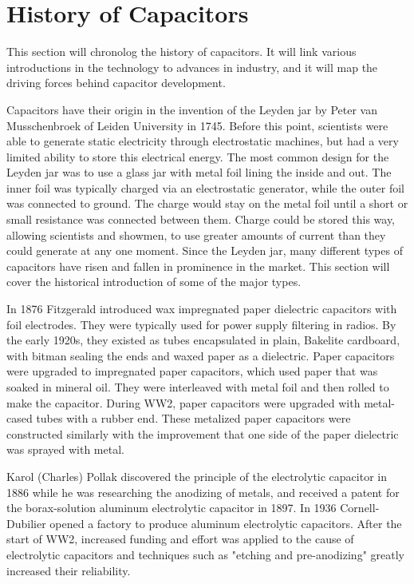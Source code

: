 \section {History of Capacitors}

This section will chronolog the history of capacitors. It will link various introductions in the technology to advances in industry, and it will map the driving forces behind capacitor development.

Capacitors have their origin in the invention of the Leyden jar by Peter van Musschenbroek of Leiden University in 1745.\cite{empLight} Before this point, scientists were able to generate static electricity through electrostatic machines, but had a very limited ability to store this electrical energy. 
\cite{ieee_hist} 
The most common design for the Leyden jar was to use a glass jar with metal foil lining the inside and out. The inner foil was typically charged via an electrostatic generator, while the outer foil was connected to ground. The charge would stay on the metal foil until a short or small resistance was connected between them. Charge could be stored this way, allowing scientists and showmen, to use greater amounts of current than they could generate at any one moment.
Since the Leyden jar, many different types of capacitors have risen and fallen in prominence in the market. This section will cover the historical introduction of some of the major types.

In 1876 Fitzgerald introduced wax impregnated paper dielectric capacitors with foil electrodes.\cite[ch.~11]{dumInv}\cite{learn_caps} They were typically used for power supply filtering in radios. By the early 1920s, they existed as tubes encapsulated in plain, Bakelite cardboard, with bitman sealing the ends and waxed paper as a dielectric.\cite[ch~3]{dumInv}
Paper capacitors were upgraded to impregnated paper capacitors, which used paper that was soaked in mineral oil. They were interleaved with metal foil and then rolled to make the capacitor.\cite[ch.~8.2.1.1]{poorIntro} During WW2, paper capacitors were upgraded with metal-cased tubes with a rubber end.\cite[ch.~8.1]{poorIntro} These metalized paper capacitors were constructed similarly with the improvement that one side of the paper dielectric was sprayed with metal.\cite{hist_cerFilt}

Karol (Charles) Pollak discovered the principle of the electrolytic capacitor in 1886 while he was researching the anodizing of metals, and received a patent for the borax-solution aluminum electrolytic capacitor in 1897.  
In 1936 Cornell-Dubilier opened a factory to produce aluminum electrolytic capacitors. 
After the start of WW2, increased funding and effort was applied to the cause of electrolytic capacitors and techniques such as "etching and pre-anodizing" greatly increased their reliability.\cite{deis_hist}\cite{wiki_elec}

